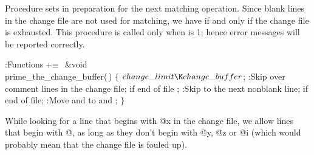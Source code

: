 Procedure  sets 
in
preparation for the next matching operation. Since blank lines in the change
file are not used for matching, we have
 if and only if
the change file is exhausted. This procedure is called only when
 is 1; hence error messages will be reported correctly.

\Y\B\4:Functions\X${}\mathrel+\equiv{}$\6
\1\1\&{void} \\{prime\_the\_change\_buffer}(\,)\2\2\6
${}\{{}$\1\6
${}\\{change\_limit}\K\\{change\_buffer}{}$;\6
:Skip over comment lines in the change file;  if end of file%
\X;\6
:Skip to the next nonblank line;  if end of file\X;\6
:Move  and  to  and %
\X;\6
\4${}\}{}$\2\par
\fi

While looking for a line that begins with \.{@x} in the change file, we
allow lines that begin with \.{@}, as long as they don't begin with \.{@y},
\.{@z} or \.{@i} (which would probably mean that the change file is fouled up).

